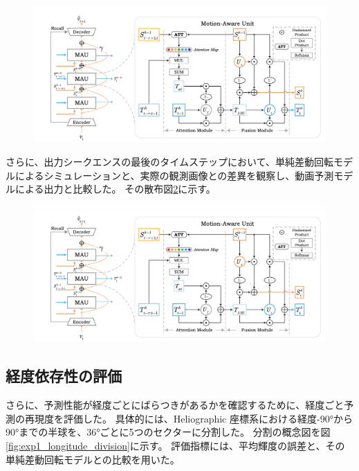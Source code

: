         \begin{figure}[htpb]
          \centering
          \includegraphics[width=\textwidth]{figures/mau.png}
          \caption{}
          \label{fig:exp1_sdr_line}
        \end{figure}
        
        さらに、出力シークエンスの最後のタイムステップにおいて、単純差動回転モデルによるシミュレーションと、実際の観測画像との差異を観察し、動画予測モデルによる出力と比較した。
        その散布図\ref{fig:exp1_sdr_scatter}に示す。
        
        \begin{figure}[htpb]
          \centering
          \includegraphics[width=\textwidth]{figures/mau.png}
          \caption{}
          \label{fig:exp1_sdr_scatter}
        \end{figure}
        

    \subsection{経度依存性の評価}
        さらに、予測性能が経度ごとにばらつきがあるかを確認するために、経度ごと予測の再現度を評価した。
        具体的には、Heliographic 座標系における経度-90°から90°までの半球を、36°ごとに5つのセクターに分割した。
        分割の概念図を図\ref{fig:exp1_longitude_division}に示す。
        評価指標には、平均輝度の誤差と、その単純差動回転モデルとの比較を用いた。
        

